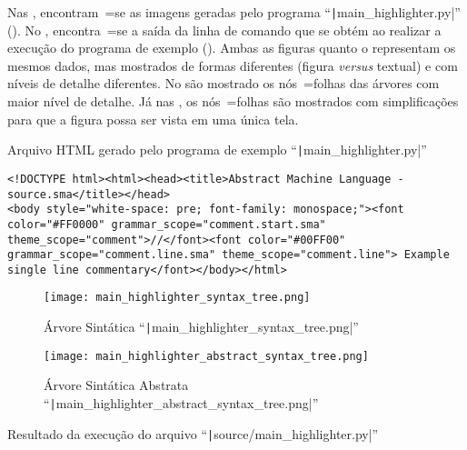 Nas ,
encontram~=se as imagens geradas pelo programa ``\texttt|main_highlighter.py|'' ().
No ,
encontra~=se a saída da linha de comando que se obtém ao realizar a execução do programa de exemplo ().
Ambas as figuras  quanto o  representam os mesmos dados,
mas mostrados de formas diferentes (figura \textit{versus} textual) e
com níveis de detalhe diferentes.
No  são mostrado os nós~=folhas das árvores com maior nível de detalhe.
Já nas ,
os nós~=folhas são mostrados com simplificações para que a figura possa ser vista em uma única tela.
\begin{code}
\caption{Arquivo HTML gerado pelo programa de exemplo ``\texttt|main_highlighter.py|''}
\label{code:MainHighlighterHtml}
\begin{verbatim}
<!DOCTYPE html><html><head><title>Abstract Machine Language - source.sma</title></head>
<body style="white-space: pre; font-family: monospace;"><font color="#FF0000" grammar_scope="comment.start.sma" theme_scope="comment">//</font><font color="#00FF00" grammar_scope="comment.line.sma" theme_scope="comment.line"> Example single line commentary</font></body></html>
\end{verbatim}
\end{code}

\begin{figure}[!htb]
\caption{Árvore Sintática ``\texttt|main_highlighter_syntax_tree.png|''}
\label{figure:MainHighlighterSyntaxTree}
\centering
\texttt{[image: main\_highlighter\_syntax\_tree.png]}
\end{figure}

\begin{figure}[!htb]
\caption{Árvore Sintática Abstrata ``\texttt|main_highlighter_abstract_syntax_tree.png|''}
\label{figure:MainHighlighterAbstractSyntaxTree}
\centering
\texttt{[image: main\_highlighter\_abstract\_syntax\_tree.png]}
\end{figure}

\begin{code}
\caption{Resultado da execução do arquivo ``\texttt|source/main_highlighter.py|''}
\label{code:MainHighlighterPyResult}
\inputminted{text}{aftertext/main_highlighter_output.txt}
\end{code}


